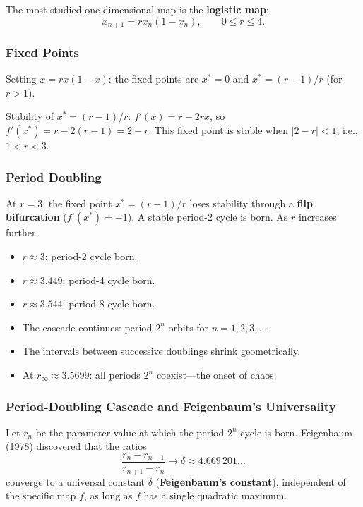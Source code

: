 \documentclass[11pt,letterpaper]{article}
\theoremstyle{definition}
\theoremstyle{plain}
\theoremstyle{remark}
\newcommand{\xstar}{x^*}
\begin{document}
The most studied one-dimensional map is the \textbf{logistic map}:
\begin{equation}\label{eq:logistic}
  x_{n+1} = rx_n(1-x_n), \qquad 0 \le r \le 4.
\end{equation}

\subsubsection{Fixed Points}

Setting $x = rx(1-x)$: the fixed points are $\xstar = 0$ and
$\xstar = (r-1)/r$ (for $r>1$).

Stability of $\xstar = (r-1)/r$:
$f'(x) = r - 2rx$, so $f'(\xstar) = r - 2(r-1) = 2 - r$.
This fixed point is stable when $|2-r|<1$, i.e., $1 < r < 3$.

\subsubsection{Period Doubling}

At $r = 3$, the fixed point $\xstar = (r-1)/r$ loses stability through a
\textbf{flip bifurcation} ($f'(\xstar) = -1$).  A stable period-2 cycle is
born.  As $r$ increases further:
\begin{itemize}[leftmargin=2em]
\item $r \approx 3$: period-2 cycle born.
\item $r \approx 3.449$: period-4 cycle born.
\item $r \approx 3.544$: period-8 cycle born.
\item The cascade continues: period $2^n$ orbits for $n = 1, 2, 3, \ldots$
\item The intervals between successive doublings shrink geometrically.
\item At $r_\infty \approx 3.5699$: all periods $2^n$ coexist---the onset
      of chaos.
\end{itemize}

\subsubsection{Period-Doubling Cascade and Feigenbaum's Universality}

Let $r_n$ be the parameter value at which the period-$2^n$ cycle is born.
Feigenbaum (1978) discovered that the ratios
\begin{equation}
  \frac{r_n - r_{n-1}}{r_{n+1} - r_n} \to \delta \approx 4.669\,201\ldots
\end{equation}
converge to a universal constant $\delta$ (\textbf{Feigenbaum's constant}),
independent of the specific map $f$, as long as $f$ has a single quadratic
maximum.
\end{document}
